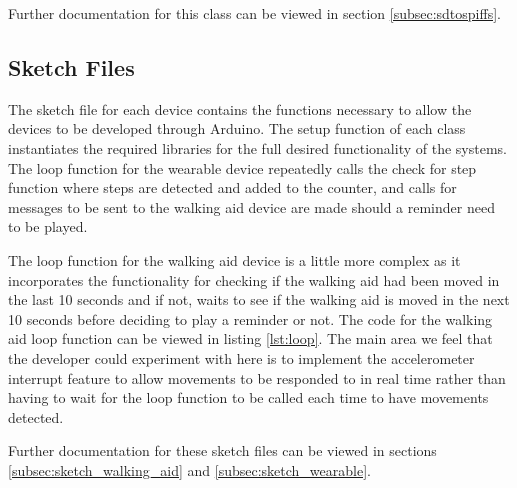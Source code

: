 				

				Further documentation for this class can be viewed in section \ref{subsec:sdtospiffs}.

			\subsection{Sketch Files}

				The sketch file for each device contains the functions necessary to allow the devices to be developed through Arduino. The setup function of each class instantiates the required libraries for the full desired functionality of the systems. The loop function for the wearable device repeatedly calls the check for step function where steps are detected and added to the counter, and calls for messages to be sent to the walking aid device are made should a reminder need to be played.

				The loop function for the walking aid device is a little more complex as it incorporates the functionality for checking if the walking aid had been moved in the last 10 seconds and if not, waits to see if the walking aid is moved in the next 10 seconds before deciding to play a reminder or not. The code for the walking aid loop function can be viewed in listing \ref{lst:loop}. The main area we feel that the developer could experiment with here is to implement the accelerometer interrupt feature to allow movements to be responded to in real time rather than having to wait for the loop function to be called each time to have movements detected.

				

				Further documentation for these sketch files can be viewed in sections \ref{subsec:sketch_walking_aid} and \ref{subsec:sketch_wearable}.

